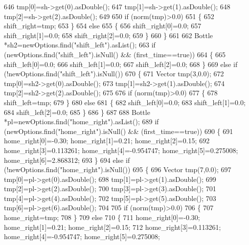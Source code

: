 \begin{DoxyCode}
646         tmp[0]=sh->get(0).asDouble();
647         tmp[1]=sh->get(1).asDouble();
648         tmp[2]=sh->get(2).asDouble();
649 
650         \textcolor{keywordflow}{if} (norm(tmp)>0.0)
651         \{
652             shift_right=tmp;
653         \}
654         \textcolor{keywordflow}{else}
655         \{
656             shift_right[0]=0.0;
657             shift_right[1]=0.0;
658             shift_right[2]=0.0;
659         \}
660     \}
661 
662     Bottle *sh2=newOptions.find(\textcolor{stringliteral}{"shift\_left"}).asList();
663     \textcolor{keywordflow}{if} (newOptions.find(\textcolor{stringliteral}{"shift\_left"}).isNull() && (first\_time==\textcolor{keyword}{true}))
664     \{
665         shift_left[0]=0.0;
666         shift_left[1]=0.0;
667         shift_left[2]=0.0;
668     \}
669     \textcolor{keywordflow}{else} \textcolor{keywordflow}{if} (!newOptions.find(\textcolor{stringliteral}{"shift\_left"}).isNull())
670     \{
671         Vector tmp(3,0.0);
672         tmp[0]=sh2->get(0).asDouble();
673         tmp[1]=sh2->get(1).asDouble();
674         tmp[2]=sh2->get(2).asDouble();
675 
676         \textcolor{keywordflow}{if} (norm(tmp)>0.0)
677         \{
678             shift_left=tmp;
679         \}
680         \textcolor{keywordflow}{else}
681         \{
682             shift_left[0]=0.0;
683             shift_left[1]=0.0;
684             shift_left[2]=0.0;
685         \}
686 \}
687 
688     Bottle *pl=newOptions.find(\textcolor{stringliteral}{"home\_right"}).asList();
689     \textcolor{keywordflow}{if} (newOptions.find(\textcolor{stringliteral}{"home\_right"}).isNull() && (first\_time==\textcolor{keyword}{true}))
690     \{
691         home_right[0]=-0.30; home_right[1]=0.21; home_right[2]=0.15;
692         home_right[3]=0.113261; home_right[4]=-0.954747; home_right[5]=0.275008; 
      home_right[6]=2.868312;
693     \}
694     \textcolor{keywordflow}{else} \textcolor{keywordflow}{if} (!newOptions.find(\textcolor{stringliteral}{"home\_right"}).isNull())
695     \{
696         Vector tmp(7,0.0);
697         tmp[0]=pl->get(0).asDouble();
698         tmp[1]=pl->get(1).asDouble();
699         tmp[2]=pl->get(2).asDouble();
700         tmp[3]=pl->get(3).asDouble();
701         tmp[4]=pl->get(4).asDouble();
702         tmp[5]=pl->get(5).asDouble();
703         tmp[6]=pl->get(6).asDouble();
704 
705         \textcolor{keywordflow}{if} (norm(tmp)>0.0)
706         \{
707             home_right=tmp;
708         \}
709         \textcolor{keywordflow}{else}
710         \{
711             home_right[0]=-0.30; home_right[1]=0.21; home_right[2]=0.15;
712             home_right[3]=0.113261; home_right[4]=-0.954747; home_right[5]=0.275008; 

\end{DoxyCode}
